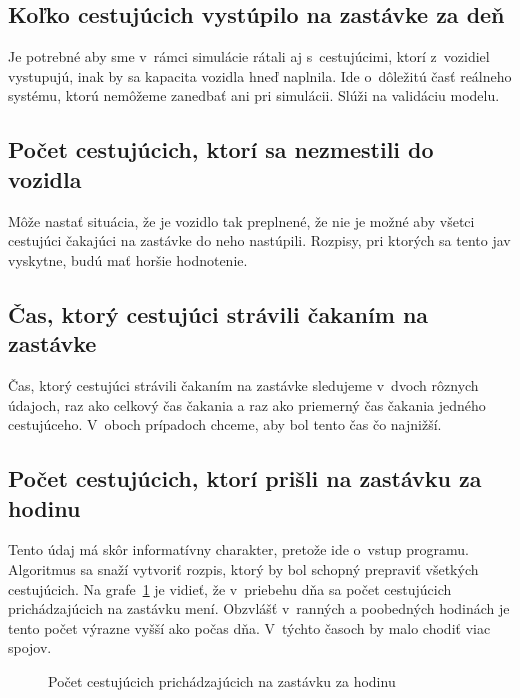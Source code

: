 \subsection*{Koľko cestujúcich vystúpilo na zastávke za deň}
Je potrebné aby sme v~rámci simulácie rátali aj s~cestujúcimi, ktorí z~vozidiel vystupujú, inak by sa kapacita vozidla hneď naplnila.
Ide o~dôležitú časť reálneho systému, ktorú nemôžeme zanedbať ani pri simulácii.
Slúži na validáciu modelu.

\subsection*{Počet cestujúcich, ktorí sa nezmestili do vozidla}
Môže nastať situácia, že je vozidlo tak preplnené, že nie je možné aby všetci cestujúci čakajúci na zastávke do neho nastúpili.
Rozpisy, pri ktorých sa tento jav vyskytne, budú mať horšie hodnotenie.

\subsection*{Čas, ktorý cestujúci strávili čakaním na zastávke}
Čas, ktorý cestujúci strávili čakaním na zastávke sledujeme v~dvoch rôznych údajoch, raz ako celkový čas čakania a raz ako priemerný čas čakania jedného cestujúceho.
V~oboch prípadoch chceme, aby bol tento čas čo najnižší.

\subsection*{Počet cestujúcich, ktorí prišli na zastávku za hodinu}
Tento údaj má skôr informatívny charakter, pretože ide o~vstup programu.
Algoritmus sa snaží vytvoriť rozpis, ktorý by bol schopný prepraviť všetkých cestujúcich.
Na grafe~\ref{fig:passengersArrivedPerHour} je vidieť, že v~priebehu dňa sa počet cestujúcich prichádzajúcich na zastávku mení.
Obzvlášť v~ranných a poobedných hodinách je tento počet výrazne vyšší ako počas dňa.
V~týchto časoch by malo chodiť viac spojov.
\begin{figure}[h]\label{fig:passengersArrivedPerHour}
  \centering
  \caption{Počet cestujúcich prichádzajúcich na zastávku za hodinu}
\end{figure}

